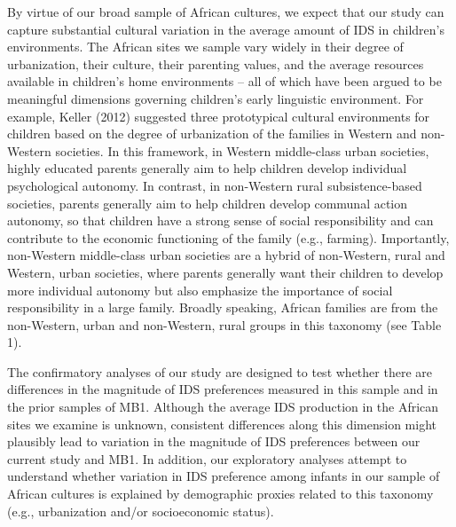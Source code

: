 \documentclass[
  ,man,floatsintext]{apa6}
\begin{document}
By virtue of our broad sample of African cultures, we expect that our study can capture substantial cultural variation in the average amount of IDS in children's environments. The African sites we sample vary widely in their degree of urbanization, their culture, their parenting values, and the average resources available in children's home environments -- all of which have been argued to be meaningful dimensions governing children's early linguistic environment. For example, Keller (2012) suggested three prototypical cultural environments for children based on the degree of urbanization of the families in Western and non-Western societies. In this framework, in Western middle-class urban societies, highly educated parents generally aim to help children develop individual psychological autonomy. In contrast, in non-Western rural subsistence-based societies, parents generally aim to help children develop communal action autonomy, so that children have a strong sense of social responsibility and can contribute to the economic functioning of the family (e.g., farming). Importantly, non-Western middle-class urban societies are a hybrid of non-Western, rural and Western, urban societies, where parents generally want their children to develop more individual autonomy but also emphasize the importance of social responsibility in a large family. Broadly speaking, African families are from the non-Western, urban and non-Western, rural groups in this taxonomy (see Table 1).

The confirmatory analyses of our study are designed to test whether there are differences in the magnitude of IDS preferences measured in this sample and in the prior samples of MB1. Although the average IDS production in the African sites we examine is unknown, consistent differences along this dimension might plausibly lead to variation in the magnitude of IDS preferences between our current study and MB1. In addition, our exploratory analyses attempt to understand whether variation in IDS preference among infants in our sample of African cultures is explained by demographic proxies related to this taxonomy (e.g., urbanization and/or socioeconomic status).
\end{document}
